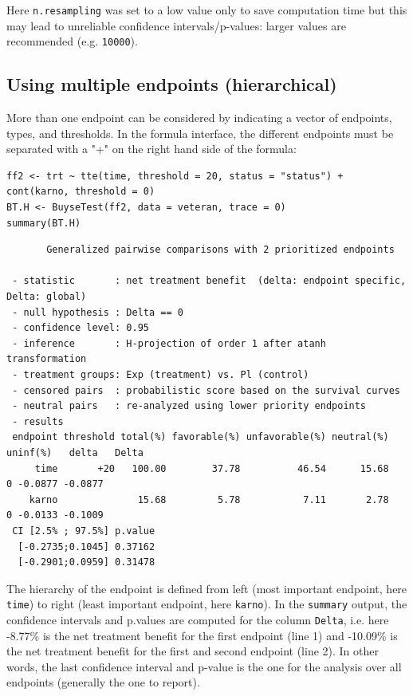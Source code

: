 \documentclass[12pt]{article}
\begin{document}
Here \texttt{n.resampling} was set to a low value only to save computation
time but this may lead to unreliable confidence intervals/p-values:
larger values are recommended (e.g. \texttt{10000}).

\subsection{Using multiple endpoints (hierarchical)}
\label{sec:orgb759520}

More than one endpoint can be considered by indicating a vector of
endpoints, types, and thresholds. In the formula interface, the
different endpoints must be separated with a "+" on the right hand
side of the formula:
\lstset{language=r,label= ,caption= ,captionpos=b,numbers=none}
\begin{lstlisting}
ff2 <- trt ~ tte(time, threshold = 20, status = "status") + cont(karno, threshold = 0)
BT.H <- BuyseTest(ff2, data = veteran, trace = 0)
summary(BT.H)
\end{lstlisting}

\begin{verbatim}
       Generalized pairwise comparisons with 2 prioritized endpoints

 - statistic       : net treatment benefit  (delta: endpoint specific, Delta: global) 
 - null hypothesis : Delta == 0 
 - confidence level: 0.95 
 - inference       : H-projection of order 1 after atanh transformation 
 - treatment groups: Exp (treatment) vs. Pl (control) 
 - censored pairs  : probabilistic score based on the survival curves
 - neutral pairs   : re-analyzed using lower priority endpoints
 - results
 endpoint threshold total(%) favorable(%) unfavorable(%) neutral(%) uninf(%)   delta   Delta
     time       +20   100.00        37.78          46.54      15.68        0 -0.0877 -0.0877
    karno              15.68         5.78           7.11       2.78        0 -0.0133 -0.1009
 CI [2.5% ; 97.5%] p.value 
  [-0.2735;0.1045] 0.37162 
  [-0.2901;0.0959] 0.31478
\end{verbatim}

The hierarchy of the endpoint is defined from left (most important
endpoint, here \texttt{time}) to right (least important endpoint, here
\texttt{karno}). In the \texttt{summary} output, the confidence intervals and
p.values are computed for the column \texttt{Delta}, i.e. here -8.77\% is the
net treatment benefit for the first endpoint (line 1) and -10.09\% is the net
treatment benefit for the first and second endpoint (line 2). In other words,
the last confidence interval and p-value is the one for the analysis
over all endpoints (generally the one to report).
\end{document}
